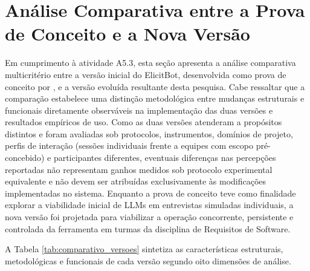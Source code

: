 \section{Análise Comparativa entre a Prova de Conceito e a Nova Versão}
\label{sec:analise_comparativa}

Em cumprimento à atividade A5.3, esta seção apresenta a análise comparativa multicritério entre a versão inicial do ElicitBot, desenvolvida como prova de conceito por , e a versão evoluída resultante desta pesquisa. Cabe ressaltar que a comparação estabelece uma distinção metodológica entre mudanças estruturais e funcionais diretamente observáveis na implementação das duas versões e resultados empíricos de uso. Como as duas versões atenderam a propósitos distintos e foram avaliadas sob protocolos, instrumentos, domínios de projeto, perfis de interação (sessões individuais frente a equipes com escopo pré-concebido) e participantes diferentes, eventuais diferenças nas percepções reportadas não representam ganhos medidos sob protocolo experimental equivalente e não devem ser atribuídas exclusivamente às modificações implementadas no sistema. Enquanto a prova de conceito teve como finalidade explorar a viabilidade inicial de LLMs em entrevistas simuladas individuais, a nova versão foi projetada para viabilizar a operação concorrente, persistente e controlada da ferramenta em turmas da disciplina de Requisitos de Software.

A Tabela \ref{tab:comparativo_versoes} sintetiza as características estruturais, metodológicas e funcionais de cada versão segundo oito dimensões de análise.

